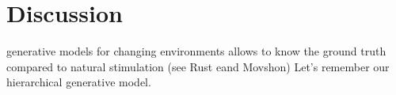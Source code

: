 \documentclass[12pt,english]{article}%
\newcommand{\citep}[1]{\parencite{#1}}
\newcommand{\citet}[1]{\textcite{#1}}
\begin{document}

\section{Discussion}

\label{sec:outro}

%
%

generative models for changing environments allows to know the ground truth compared to natural stimulation (see Rust eand Movshon)%
Let's remember our hierarchical generative model.
\end{document}
